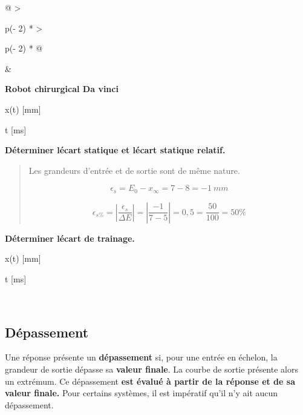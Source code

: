 \begin{longtable}[]{@{}
  >{\raggedright\arraybackslash}p{(\columnwidth - 2\tabcolsep) * }
  >{\raggedright\arraybackslash}p{(\columnwidth - 2\tabcolsep) * }@{}}
\toprule\noalign{}
\begin{minipage}[b]{\linewidth}\raggedright
\begin{quote}
\end{quote}
\end{minipage} & \begin{minipage}[b]{\linewidth}\raggedright
\textbf{Robot chirurgical Da vinci}


x(t) {[}mm{]}


t {[}ms{]}

\textbf{Déterminer l\textquotesingle écart statique et
l\textquotesingle écart statique relatif.}

\begin{quote}
Les grandeurs d'entrée et de sortie sont de même nature.

\[\epsilon_{s} = E_{0} - x_{\infty} = 7 - 8 = - 1\ mm\]

\[\epsilon_{s\%} = \left| \frac{\epsilon_{s}}{\Delta E} \right| = \left| \frac{- 1}{7 - 5} \right| = 0,5 = \frac{50}{100} = 50\%\]
\end{quote}

\textbf{Déterminer l\textquotesingle écart de trainage.}

x(t) {[}mm{]}

t {[}ms{]}

\end{minipage} \\
\midrule\noalign{}
\endhead
\bottomrule\noalign{}
\endlastfoot
\end{longtable}

\subsection{Dépassement}\label{duxe9passement}

Une réponse présente un \textbf{dépassement} si, pour une entrée en
échelon, la grandeur de sortie dépasse sa \textbf{valeur finale}. La
courbe de sortie présente alors un extrémum. Ce dépassement \textbf{est
évalué à partir de la réponse et de sa valeur finale.} Pour certains
systèmes, il est impératif qu'il n'y ait aucun dépassement.

